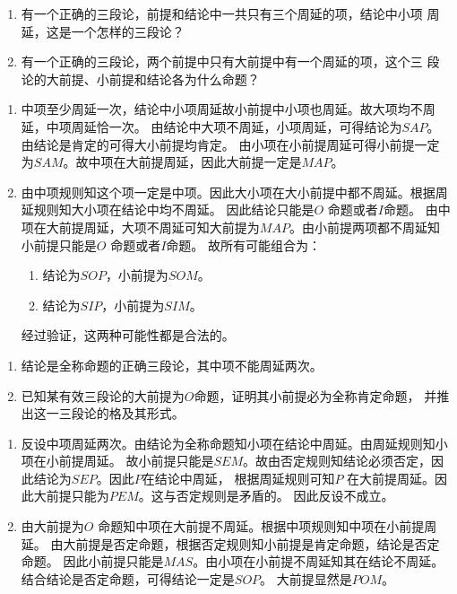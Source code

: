 \documentclass{ctexart}
\begin{document}
\begin{problem}\label{pro:9}
  \begin{enumerate}
    \item 有一个正确的三段论，前提和结论中一共只有三个周延的项，结论中小项
      周延，这是一个怎样的三段论？
    \item 有一个正确的三段论，两个前提中只有大前提中有一个周延的项，这个三
      段论的大前提、小前提和结论各为什么命题？
  \end{enumerate}
\end{problem}
\begin{solution}
  \begin{enumerate}
    \item 中项至少周延一次，结论中小项周延故小前提中小项也周延。故大项均不周延，中项周延恰一次。
      由结论中大项不周延，小项周延，可得结论为\(SAP\)。由结论是肯定的可得大小前提均肯定。
      由小项在小前提周延可得小前提一定为\(SAM\)。故中项在大前提周延，因此大前提一定是\(MAP\)。
    \item 由中项规则知这个项一定是中项。因此大小项在大小前提中都不周延。根据周延规则知大小项在结论中均不周延。
      因此结论只能是\(O\) 命题或者\(I\)命题。
      由中项在大前提周延，大项不周延可知大前提为\(MAP\)。由小前提两项都不周延知小前提只能是\(O\) 命题或者\(I\)命题。
      故所有可能组合为：
      \begin{enumerate}
        \item 结论为\(SOP\)，小前提为\(SOM\)。
        \item 结论为\(SIP\)，小前提为\(SIM\)。
      \end{enumerate}
      经过验证，这两种可能性都是合法的。
  \end{enumerate}
\end{solution}
\begin{problem}\label{pro:10}
  \begin{enumerate}
    \item 结论是全称命题的正确三段论，其中项不能周延两次。
    \item 已知某有效三段论的大前提为\(O\)命题，证明其小前提必为全称肯定命题，
      并推出这一三段论的格及其形式。
  \end{enumerate}
\end{problem}
\begin{solution}
  \begin{enumerate}
    \item 反设中项周延两次。由结论为全称命题知小项在结论中周延。由周延规则知小项在小前提周延。
      故小前提只能是\(SEM\)。故由否定规则知结论必须否定，因此结论为\(SEP\)。因此\(P\)在结论中周延，
      根据周延规则可知\(P\) 在大前提周延。因此大前提只能为\(PEM\)。这与否定规则是矛盾的。
      因此反设不成立。
    \item 由大前提为\(O\) 命题知中项在大前提不周延。根据中项规则知中项在小前提周延。
      由大前提是否定命题，根据否定规则知小前提是肯定命题，结论是否定命题。
      因此小前提只能是\(MAS\)。由小项在小前提不周延知其在结论不周延。结合结论是否定命题，可得结论一定是\(SOP\)。
      大前提显然是\(POM\)。
  \end{enumerate}
\end{solution}
\end{document}

